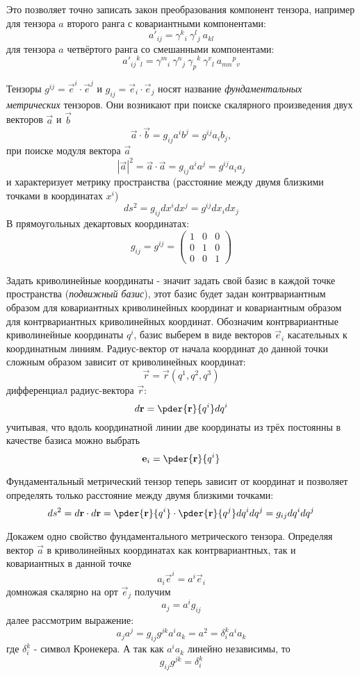 Это позволяет точно записать закон преобразования компонент тензора, например
для тензора \( a \) второго ранга с ковариантными компонентами:
\[
    a'_{ij} = \gamma^k{}_i\ \gamma^l{}_j\ a_{kl}
\]
для тензора \( a \) четвёртого  ранга со смешанными компонентами:
\[
    a'_{ij}{}^{k}{}_{l} = \gamma^m{}_i\ \gamma^n{}_j\ 
    \gamma_p{}^k\ \gamma^v{}_l\ a_{mn}{}^{p}{}_{v}
\]  

Тензоры \( g^{ij} = \vec{e}^{i} \cdot \vec{e}^{j} \) и
\( g_{ij} = \vec{e}_{i} \cdot \vec{e}_{j} \) носят название
\emph{фундаментальных метрических} тензоров. Они возникают при поиске
скалярного произведения двух векторов \( \vec{a} \) и \( \vec{b} \)
\[
    \vec{a}\cdot\vec{b} = g_{ij} a^i b^j = g^{ij} a_i b_j,
\]
при поиске модуля вектора \( \vec{a} \)
\[
    |\vec{a}|^2 = \vec{a}\cdot\vec{a} =
    g_{ij}a^ia^j = g^{ij} a_i a_j
\]
и характеризует метрику пространства (расстояние между двумя близкими точками в координатах \( x^i \))
\[
    ds^2 = g_{ij}dx^idx^j = g^{ij} dx_i dx_j
\]      
В прямоугольных декартовых координатах:
\[
    g_{ij} = g^{ij} =
        \left(
            \begin{array}{ccc}
            1 & 0 & 0 \\
            0 & 1 & 0 \\
            0 & 0 & 1
            \end{array}
        \right)
\]
    
Задать криволинейные координаты - значит задать свой базис в каждой точке
пространства (\emph{подвижный базис}), этот базис будет задан контрвариантным
образом для ковариантных криволинейных координат и ковариантным образом для
контрвариантных криволинейных координат. Обозначим контрвариантные
криволинейные координаты \( q^i \), базис выберем в виде векторов
\( \vec{e}_{i} \) касательных к координатным линиям. Радиус-вектор от начала
координат до данной точки сложным образом зависит от криволинейных координат:
\[
    \vec{r} = \vec{r}(q^1, q^2, q^3)
\]
дифференциал радиус-вектора \( \vec{r} \):
\[
    d\vec{r} = \pder{\vec{r}}{q^i}dq^i
\]
учитывая, что вдоль координатной линии две координаты из трёх постоянны в
качестве базиса можно выбрать
\[
    \vec{e}_{i} =  \pder{\vec{r}}{q^i}
\]
    
Фундаментальный метрический тензор теперь зависит от координат и позволяет
определять только расстояние между двумя близкими точками:
\[
    ds^2 = d\vec{r}\cdot d\vec{r} = 
    \pder{ \vec{r}}{q^i}\cdot \pder{ \vec{r}}{q^j} dq^i dq^j =
    g_{ij} dq^i dq^j
\]

Докажем одно свойство фундаментального метрического тензора. Определяя вектор
\( \vec{a} \) в криволинейных координатах как контрвариантных, так и
ковариантных в данной точке 
\[
    a_i \vec{e}^{i} =  a^i \vec{e}_{i}
\]
домножая скалярно на орт \( \vec{e}_{j} \) получим
\[
    a_j = a^i g_{ij}
\]
далее рассмотрим выражение:
\[
    a_j a^j = g_{ij} g^{jk} a^i a_k = a^2 = \delta^k_i a^i a_k
\]
где \( \delta^k_i \) - символ Кронекера.
А так как \( a^i a_k \) линейно независимы, то 
\[
    g_{ij} g^{jk}= \delta^k_i
\]


